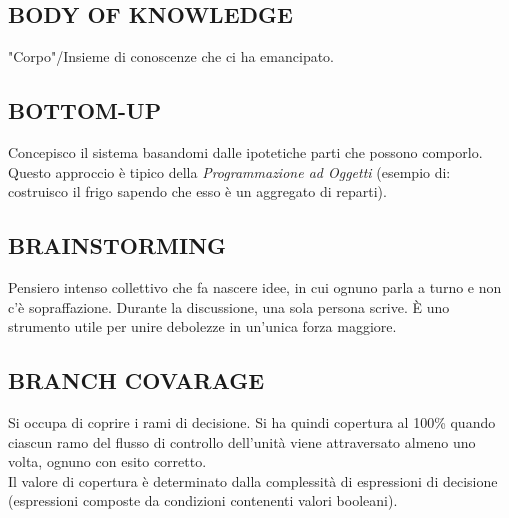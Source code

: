 		
		\subsection{BODY OF KNOWLEDGE}  \label{body}
		"Corpo"/Insieme di conoscenze che ci ha emancipato.
		
		
		\subsection{BOTTOM-UP} \label{bottomup}
		Concepisco il sistema basandomi dalle ipotetiche parti che possono comporlo. Questo approccio è tipico della \textit{Programmazione ad Oggetti} (esempio di: costruisco il frigo sapendo che esso è un aggregato di reparti). 
		
		
		\subsection{BRAINSTORMING}  \label{brainstorming}
		Pensiero intenso collettivo che fa nascere idee, in cui ognuno parla a turno e non c'è sopraffazione. Durante la discussione, una sola persona scrive. È uno strumento utile per unire debolezze in un'unica forza maggiore.
	
	
		\subsection{BRANCH COVARAGE}		\label{branchcoverage}
		Si occupa di coprire i rami di decisione. Si ha quindi copertura al 100\% quando ciascun ramo del flusso di controllo dell'unità viene attraversato almeno uno volta, ognuno con esito corretto. \\
		Il valore di copertura è determinato dalla complessità di espressioni di decisione (espressioni composte da condizioni contenenti valori booleani).
		